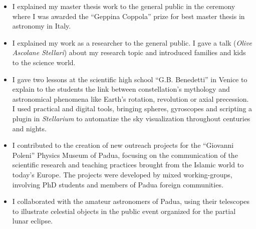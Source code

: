 \begin{experiences}
{\begin{itemize}
     \end{itemize}}
    \emptySeparator
     {}{
     \begin{itemize}
         \item I explained my master thesis work to the general public in the ceremony where I was awarded the ``Geppina Coppola'' prize for best master thesis in astronomy in Italy.
     \end{itemize}}
     \emptySeparator
     {}{
     \begin{itemize}
         \item I explained my work as a researcher to the general public. I gave a talk (\emph{Olive Ascolane Stellari}) about my research topic and introduced families and kids to the science world.
     \end{itemize}}
    \emptySeparator
     {}{
     \begin{itemize}
         \item I gave two lessons at the scientific high school ``G.B. Benedetti'' in Venice to explain to the students the link between constellation's mythology and astronomical phenomena like Earth's rotation, revolution or axial precession. I used practical and digital tools, bringing spheres, gyroscopes and scripting a plugin in \emph{Stellarium} to automatize the sky visualization throughout centuries and nights.
     \end{itemize}}
    \emptySeparator
     {}{
     \begin{itemize}
         \item I contributed to the creation of new outreach projects for the ``Giovanni Poleni'' Physics Museum of Padua, focusing on the communication of the scientific research and teaching practices brought from the Islamic world to today's Europe. The projects were developed by mixed working-groups, involving PhD students and members of Padua foreign communities.
     \end{itemize}}
    \emptySeparator
     {}{
     \begin{itemize}
         \item I collaborated with the amateur astronomers of Padua, using their telescopes to illustrate celestial objects in the public event organized for the partial lunar eclipse.
     \end{itemize}}
\end{experiences}